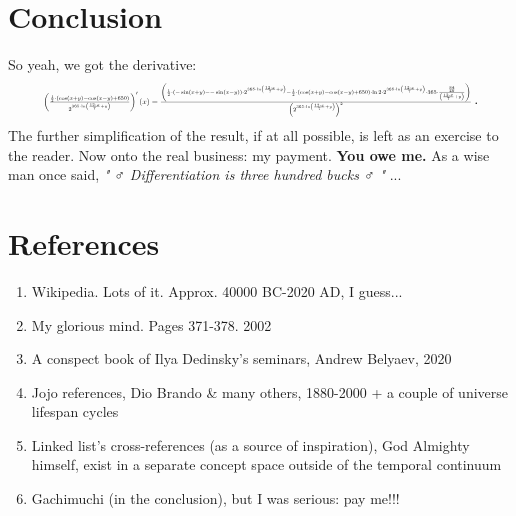 \documentclass[12pt]{article}
\begin{document}
\section{\Large{Conclusion}}
So yeah, we got the derivative: 
\begin{equation}
\resizebox{.9\hsize}{!}{ $ 
\left(\frac{\frac{ 1 }{ 2 } \cdot \left(\cos \left( x  +  y \right) - \cos \left( x  -  y \right) +  650 \right)}{ 2 ^{ 365  \cdot \ln \left(\frac{ 12  \cdot  x }{ 7 } +  y \right)}}\right)'\left(x\right) = \frac{\left(\frac{ 1 }{ 2 } \cdot \left(- \sin \left( x  +  y \right) - - \sin \left( x  -  y \right)\right) \cdot  2 ^{ 365  \cdot \ln \left(\frac{ 12  \cdot  x }{ 7 } +  y \right)} - \frac{ 1 }{ 2 } \cdot \left(\cos \left( x  +  y \right) - \cos \left( x  -  y \right) +  650 \right) \cdot \ln  2  \cdot  2 ^{ 365  \cdot \ln \left(\frac{ 12  \cdot  x }{ 7 } +  y \right)} \cdot  365  \cdot \frac{\frac{ 84 }{ 49 }}{\left(\frac{ 12  \cdot  x }{ 7 } +  y \right)}\right)}{\left( 2 ^{ 365  \cdot \ln \left(\frac{ 12  \cdot  x }{ 7 } +  y \right)}\right)^{ 2 }} 
$ }. 
\end{equation}
The further simplification of the result, if at all possible, is left as an exercise to the reader.
Now onto the real business: my payment. \textbf{You owe me.}
As a wise man once said, \textit{" ♂ Differentiation is three hundred bucks ♂ "} ...
\section{\Large{References}}
\begin{enumerate}
\item Wikipedia. Lots of it. Approx. 40000 BC-2020 AD, I guess...
\item My glorious mind. Pages 371-378. 2002
\item A conspect book of Ilya Dedinsky's seminars, Andrew Belyaev, 2020
\item Jojo references, Dio Brando \& many others, 1880-2000 + a couple of universe lifespan cycles
\item Linked list's cross-references (as a source of inspiration), God Almighty himself, exist in a separate concept space outside of the temporal continuum
\item Gachimuchi (in the conclusion), but I was serious: pay me!!!
\end{enumerate}
\end{document}
